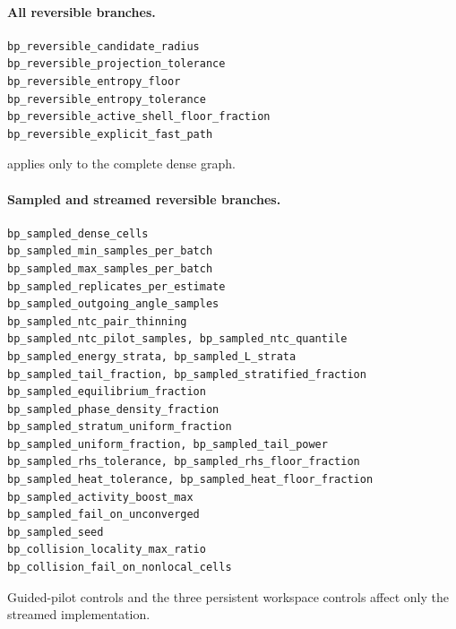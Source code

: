 \paragraph{All reversible branches.}
\begin{lstlisting}
bp_reversible_candidate_radius
bp_reversible_projection_tolerance
bp_reversible_entropy_floor
bp_reversible_entropy_tolerance
bp_reversible_active_shell_floor_fraction
bp_reversible_explicit_fast_path
\end{lstlisting}
 applies only to the complete dense
graph.

\paragraph{Sampled and streamed reversible branches.}
\begin{lstlisting}
bp_sampled_dense_cells
bp_sampled_min_samples_per_batch
bp_sampled_max_samples_per_batch
bp_sampled_replicates_per_estimate
bp_sampled_outgoing_angle_samples
bp_sampled_ntc_pair_thinning
bp_sampled_ntc_pilot_samples, bp_sampled_ntc_quantile
bp_sampled_energy_strata, bp_sampled_L_strata
bp_sampled_tail_fraction, bp_sampled_stratified_fraction
bp_sampled_equilibrium_fraction
bp_sampled_phase_density_fraction
bp_sampled_stratum_uniform_fraction
bp_sampled_uniform_fraction, bp_sampled_tail_power
bp_sampled_rhs_tolerance, bp_sampled_rhs_floor_fraction
bp_sampled_heat_tolerance, bp_sampled_heat_floor_fraction
bp_sampled_activity_boost_max
bp_sampled_fail_on_unconverged
bp_sampled_seed
bp_collision_locality_max_ratio
bp_collision_fail_on_nonlocal_cells
\end{lstlisting}
Guided-pilot controls and the three persistent workspace controls affect only
the streamed implementation.

